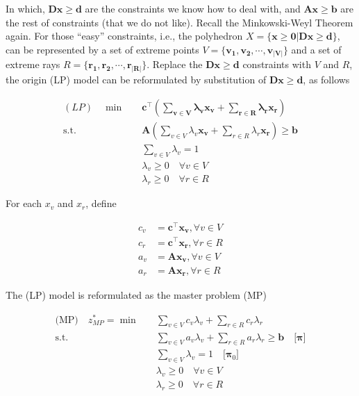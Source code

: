         In which, $\mathbf{Dx \ge d}$ are the constraints we know how to deal with, and $\mathbf{Ax \ge b}$ are the rest of constraints (that we do not like). Recall the Minkowski-Weyl Theorem again. For those ``easy'' constraints, i.e., the polyhedron $X = \{\mathbf{x \ge 0} | \mathbf{Dx \ge d}\}$, can be represented by a set of extreme points $V = \{\mathbf{v_1}, \mathbf{v_2}, \cdots, \mathbf{v_{|V|}}\}$ and a set of extreme rays $R = \{\mathbf{r_1}, \mathbf{r_2}, \cdots, \mathbf{r_{|R|}}\}$. Replace the $\mathbf{Dx \ge d}$ constraints with $V$ and $R$, the origin (LP) model can be reformulated by substitution of $\mathbf{Dx \ge d}$, as follows

        \begin{align*}
            (LP) \quad \min \quad & \mathbf{c^\top (\sum_{v \in V} \lambda_v \mathbf{x_v} + \sum_{r \in R}\lambda_r \mathbf{x_r})} \\
            \text{s.t.} \quad & \mathbf{A} (\sum_{v \in V} \lambda_v \mathbf{x_v} + \sum_{r \in R}\lambda_r \mathbf{x_r}) \ge \mathbf{b} \\
            & \sum_{v \in V} \lambda_v = 1\\
            & \lambda_v \ge 0 \quad \forall v \in V\\
            & \lambda_r \ge 0 \quad \forall r \in R
        \end{align*}

        For each $x_v$ and $x_r$, define

        \begin{align*}
            c_v &= \mathbf{c^\top x_v}, \forall v \in V \\
            c_r &= \mathbf{c^\top x_r}, \forall r \in R\\
            a_v &= \mathbf{A x_v},  \forall v\in V\\
            a_r &= \mathbf{A x_r}, \forall r \in R
        \end{align*}

        The (LP) model is reformulated as the master problem (MP)

        \begin{align*}
            \text{(MP)} \quad z_{MP}^* = \min \quad & \sum_{v \in V} c_v \lambda_v + \sum_{r \in R} c_r \lambda_r\\
            \text{s.t.} \quad & \sum_{v \in V} a_v \lambda_v + \sum_{r \in R} a_r \lambda_r \ge \mathbf{b} \quad \text{[$\mathbf{\pi}$]}\\
            & \sum_{v \in V} \lambda_v = 1 \quad \text{[$\mathbf{\pi}_0]$}\\
            & \lambda_v \ge 0 \quad \forall v \in V\\
            & \lambda_r \ge 0 \quad \forall r \in R
        \end{align*}

